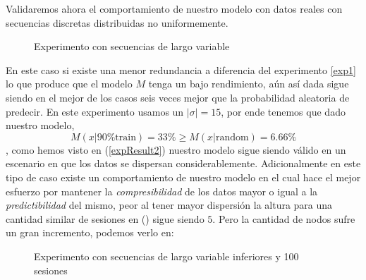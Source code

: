 Validaremos ahora el comportamiento de nuestro modelo con datos reales con secuencias discretas distribuidas no uniformemente.
	
	
	
	
	
	\begin{figure}[h] 
		\centering
		\caption{Experimento con secuencias de largo variable}
		\label{fig:experimento2}
	\end{figure}
	
	

		
	En este caso si existe una menor redundancia a diferencia del experimento \ref{exp1} lo que produce que el modelo $M$ tenga un bajo rendimiento, aún así dada sigue siendo en el mejor de los casos seis veces mejor que la probabilidad aleatoria de predecir. En este experimento usamos un $|\sigma| =15$, por ende tenemos que dado nuestro modelo,
	\begin{equation}\label{expResult2}
		M( x | \mbox{90\% train}  ) = 33 \% \geq M( x | \mbox{random}  ) = 6.66\% 
	\end{equation}, como hemos visto en (\ref{expResult2}) nuestro modelo sigue siendo válido en un escenario en que los datos se dispersan considerablemente. 
	Adicionalmente en este tipo de caso existe un comportamiento de nuestro modelo en el cual hace el mejor esfuerzo por mantener la \emph{compresibilidad} de los datos mayor o igual a la \emph{predictibilidad} del mismo, peor al tener mayor dispersión la altura para una cantidad similar de sesiones en (\label{expResult2}) sigue siendo $5$. Pero la cantidad de nodos sufre un gran incremento, podemos verlo en:
	
	
	
	\begin{figure}[h] 
		\centering
		
		\caption{Experimento con secuencias de largo variable inferiores y 100 sesiones}
		\label{fig:exp-largo-variable-inf}
	\end{figure}
	
